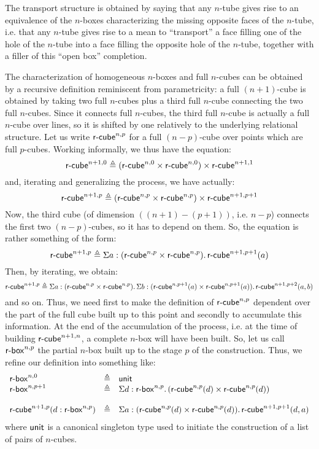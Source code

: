 \documentclass{article}
\newcommand{\defeq}{\triangleq}
\begin{document}
The transport structure is obtained by saying that any $n$-tube gives
rise to an equivalence of the $n$-boxes characterizing the missing
opposite faces of the $n$-tube, i.e. that any $n$-tube gives rise to a
mean to ``transport'' a face filling one of the hole of the $n$-tube
into a face filling the opposite hole of the $n$-tube, together with a
filler of this ``open box'' completion.
\fi

The characterization of homogeneous $n$-boxes and full $n$-cubes can
be obtained by a recursive definition reminiscent from parametricity:
a full $(n+1)$-cube is obtained by taking two full $n$-cubes plus a
third full $n$-cube connecting the two full $n$-cubes. Since it
connects full $n$-cubes, the third full $n$-cube is actually a full
$n$-cube over lines, so it is shifted by one relatively to the
underlying relational structure. Let us write $\mathsf{r\mbox{-}cube}_{}^{n,p}$ for a
full $(n-p)$-cube over points which are full $p$-cubes. Working
informally, we thus have the equation:
$$
\mycube{}^{n+1,0} \defeq (\mycube{}^{n,0} \times \mycube{}^{n,0}) \times \mycube{}^{n+1,1}
$$
and, iterating and generalizing the process, we have actually:
$$
\mycube{}^{n+1,p} \defeq (\mycube{}^{n,p} \times \mycube{}^{n,p}) \times \mycube{}^{n+1,p+1}
$$ 
Now, the third cube (of dimension $((n+1)-(p+1))$, i.e. $n-p$) connects the first two
$(n-p)$-cubes, so it has to depend on them. So, the equation is rather
something of the form:
$$
\mycube{}^{n+1,p} \defeq \Sigma a:(\mycube{}^{n,p} \times \mycube{}^{n,p}).\, \mycube{}^{n+1,p+1}(a)
$$
Then, by iterating, we obtain:
$$ 
\mycube{}^{n+1,p} \defeq \Sigma a:(\mycube{}^{n,p} \times \mycube{}^{n,p}).\,
 \Sigma b:(\mycube{}^{n,p+1}(a) \times \mycube{}^{n,p+1}(a)). \, \mycube{}^{n+1,p+2}(a,b)
$$
and so on. Thus, we need first to make the definition of
$\mathsf{r\mbox{-}cube}_{}^{n,p}$ dependent over the part of the full cube built up to
this point and secondly to accumulate this information. At the end of
the accumulation of the process, i.e. at the time of building
$\mathsf{r\mbox{-}cube}_{}^{n+1,n}$, a complete $n$-box will have been built. So, let us
call $\mathsf{r\mbox{-}box}_{}^{n,p}$ the partial $n$-box built up to the stage $p$
of the construction. Thus, we refine our definition into something like:
$$
\begin{array}{lll}
\mybox{}^{n,0} &\defeq& \unittype\\
\mybox{}^{n,p+1} &\defeq& \Sigma d:\mybox{}^{n,p}.\,(\mycube{}^{n,p}(d) \times \mycube{}^{n,p}(d))\\
\\
\mycube{}^{n+1,p}(d:\mybox{}^{n,p}) &\defeq& \Sigma a:(\mycube{}^{n,p}(d) \times \mycube{}^{n,p}(d)).\,\mycube{}^{n+1,p+1}(d,a)
\end{array}
$$
where $\mathsf{unit}$ is a canonical singleton type used to initiate the
construction of a list of pairs of $n$-cubes.
\end{document}
